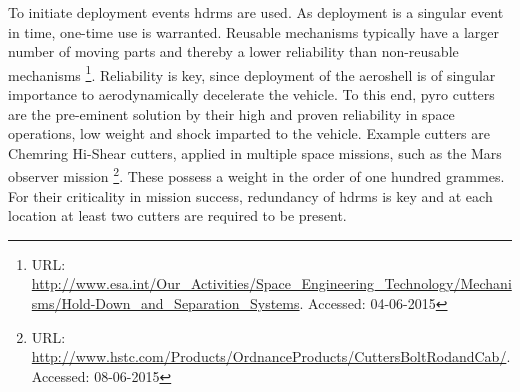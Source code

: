 To initiate deployment events \glspl{hdrm} are used. As deployment is a singular event in time, one-time use is warranted. Reusable mechanisms typically have a larger number of moving parts and thereby a lower reliability than non-reusable mechanisms \footnote{URL: \url{http://www.esa.int/Our_Activities/Space_Engineering_Technology/Mechanisms/Hold-Down_and_Separation_Systems}. Accessed: 04-06-2015}. Reliability is key, since deployment of the aeroshell is of singular importance to aerodynamically decelerate the vehicle. To this end, pyro cutters are the pre-eminent solution by their high and proven reliability in space operations, low weight and shock imparted to the vehicle. Example cutters are Chemring Hi-Shear cutters, applied in multiple space missions, such as the Mars observer mission \footnote{URL: \url{http://www.hstc.com/Products/OrdnanceProducts/CuttersBoltRodandCab/}. Accessed: 08-06-2015}. These possess a weight in the order of one hundred grammes. For their criticality in mission success, redundancy of \glspl{hdrm} is key and at each location at least two cutters are required to be present.

